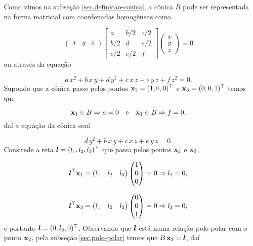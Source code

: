 Como vimos na subseção \ref{sec.definicao-conica}, a cônica $B$ pode ser representada na forma matricial com coordenadas homogêneas como

\begin{equation*}
\begin{pmatrix}
x&y&z
\end{pmatrix}
\begin{bmatrix}
a&b/2&c/2\\
b/2&d&e/2\\
c/2&e/2&f
\end{bmatrix}
\begin{pmatrix}
x\\
y\\
z
\end{pmatrix}
=0
\end{equation*}
ou através da equação

\begin{equation*}
a\,x^2+b\,x\,y+d\,y^2+c\,x\,z+e\,y\,z+f\,z^2=0.
\end{equation*}
Supondo que a cônica passe pelos pontos $\mathbf{x}_1=(1,0,0)^\top$ e $\mathbf{x}_3=(0,0,1)^\top$ temos que

\begin{equation*}
\mathbf{x}_1\in B\Rightarrow a=0\quad\text{e}\quad\mathbf{x}_3\in B\Rightarrow f=0,
\end{equation*}
daí a equação da cônica será 

\begin{equation}\label{eq.reducao-parcial-conica}
d\,y^2+b\,x\,y+c\,x\,z+e\,y\,z=0.
\end{equation}
Consirede a reta $\boldsymbol{l}=(l_1,l_2,l_3)^\top$ que passa pelos pontos $\mathbf{x}_1$ e $\mathbf{x}_3$,

\begin{equation*}
\boldsymbol{l}^\top\mathbf{x}_1=
\begin{pmatrix}
l_1&l_2&l_3
\end{pmatrix}
\begin{pmatrix}
1\\
0\\
0
\end{pmatrix}
=0
\Rightarrow l_1=0,
\end{equation*} 

\begin{equation*}
\boldsymbol{l}^\top\mathbf{x}_3=
\begin{pmatrix}
l_1&l_2&l_3
\end{pmatrix}
\begin{pmatrix}
0\\
0\\
1
\end{pmatrix}
=0
\Rightarrow l_3=0,
\end{equation*} 
e portanto $\boldsymbol{l}=(0,l_2,0)^\top$.
Observando que $\boldsymbol{l}$ está numa relação polo-polar com o ponto $\mathbf{x}_2$, pela subseção \ref{sec.polo-polar} temos que $B\,\mathbf{x}_2=\boldsymbol{l}$, daí

